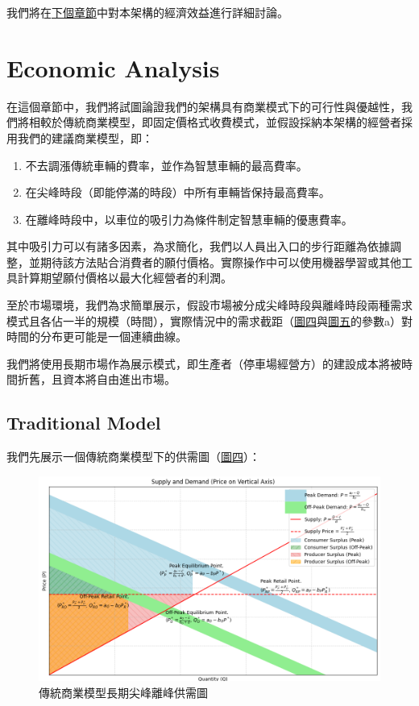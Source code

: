 \documentclass[sigconf,authorversion,nonacm,screen]{acmart}
\begin{document}
\quad 我們將在\hyperref[sec:EA]{下個章節}中對本架構的經濟效益進行詳細討論。


\section{Economic Analysis}
\label{sec:EA}

\quad 在這個章節中，我們將試圖論證我們的架構具有商業模式下的可行性與優越性，我們將相較於傳統商業模型，即固定價格式收費模式，並假設採納本架構的經營者採用我們的建議商業模型，即：

\begin{enumerate}
    \item 不去調漲傳統車輛的費率，並作為智慧車輛的最高費率。
    \item 在尖峰時段（即能停滿的時段）中所有車輛皆保持最高費率。
    \item 在離峰時段中，以車位的吸引力為條件制定智慧車輛的優惠費率。
\end{enumerate}

其中吸引力可以有諸多因素，為求簡化，我們以人員出入口的步行距離為依據調整，並期待該方法貼合消費者的願付價格。實際操作中可以使用機器學習或其他工具計算期望願付價格以最大化經營者的利潤。

至於市場環境，我們為求簡單展示，假設市場被分成尖峰時段與離峰時段兩種需求模式且各佔一半的規模（時間），實際情況中的需求截距（\hyperref[fig:TM]{圖四}與\hyperref[fig:OM]{圖五}的參數a）對時間的分布更可能是一個連續曲線。

我們將使用長期市場作為展示模式，即生產者（停車場經營方）的建設成本將被時間折舊，且資本將自由進出市場。

\subsection{Traditional Model}

\quad 我們先展示一個傳統商業模型下的供需圖（\hyperref[fig:TM]{圖四}）：

\begin{figure}[h]
    \centering
    \includegraphics[width=1.0\linewidth]{TM.png}
    \caption{傳統商業模型長期尖峰離峰供需圖}
    \label{fig:TM}
\end{figure}
\end{document}

